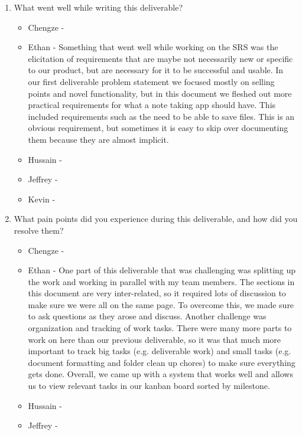 \begin{enumerate}
  \item What went well while writing this deliverable?
  \begin{itemize}
        \item Chengze - 
        \item Ethan - Something that went well while working on the SRS was the
          elicitation of requirements that are maybe not necessarily new or
          specific to our product, but are necessary for it to be successful
          and usable. In our first deliverable problem statement we focused
          mostly on selling points and novel functionality, but in this
          document we fleshed out more practical requirements for what a note
          taking app should have. This included requirements such as the need
          to be able to save files. This is an obvious requirement, but
          sometimes it is easy to skip over documenting them because they are
          almost implicit.
        \item Hussain - 
        \item Jeffrey - 
        \item Kevin - 
  \end{itemize} 
  \item What pain points did you experience during this deliverable, and how did
  you resolve them?
  \begin{itemize}
        \item Chengze - 
        \item Ethan - One part of this deliverable that was challenging was
          splitting up the work and working in parallel with my team members.
          The sections in this document are very inter-related, so it required
          lots of discussion to make sure we were all on the same page. To
          overcome this, we made sure to ask questions as they arose and
          discuss. Another challenge was organization and tracking of work
          tasks. There were many more parts to work on here than our previous
          deliverable, so it was that much more important to track big tasks
          (e.g. deliverable work) and small tasks (e.g. document formatting and
          folder clean up chores) to make sure everything gets done. Overall,
          we came up with a system that works well and allows us to view
          relevant tasks in our kanban board sorted by milestone.
        \item Hussain - 
        \item Jeffrey - 

\end{itemize}
\end{enumerate}
